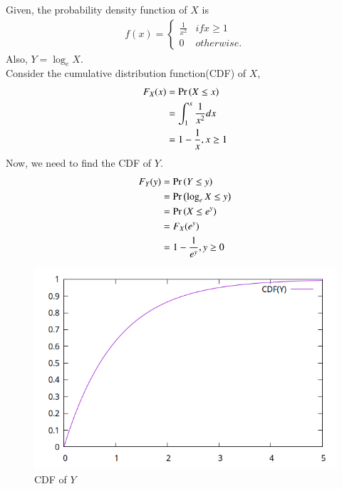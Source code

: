 \documentclass[journal,11pt]{IEEEtran}
\begin{document}
\begin{enumerate}
          \solution
          Given, the probability density function of $X$ is
          \begin{align}
              f(x) = \begin{cases}
                         \frac{1}{x^2} & if x \geq 1 \\
                         0             & otherwise.
                     \end{cases}
          \end{align}
          Also, $Y = \log_e X$.\\
          Consider the cumulative distribution function(CDF) of $X$,
          \begin{align}
              F_X(x) & = \Pr\left(X \leq x\right)                 \\
                     & = \int_{1}^{x} \frac{1}{x^2} dx \\
                     & = 1 - \frac{1}{x} , x \geq 1
          \end{align}
          Now, we need to find the CDF of $Y$.
          \begin{align}
              F_Y(y) & = \Pr\left(Y \leq y\right)                \\
                     & = \Pr\left(\log_e X \leq y\right)         \\
                     & = \Pr\left(X \leq e^y\right)              \\
                     & = F_X(e^y)                     \\
                     & = 1 - \frac{1}{e^y} , y \geq 0
          \end{align}
          \begin{figure}[!ht]
              \centering
              \includegraphics[width=\columnwidth]{./figs/cdf_plot.png}
              \caption{CDF of $Y$}
              \label{fig:cdf_plot}
          \end{figure}



\end{enumerate}
\end{document}
